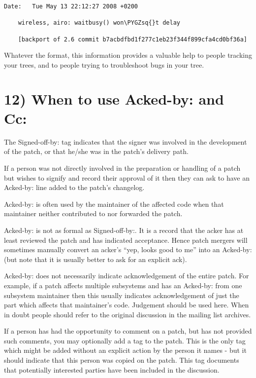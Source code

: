 \documentclass[a4paper,8pt,english]{sphinxmanual}
\def\PYGZsq{\char`\'}
\renewcommand\PYGZsq{\textquotesingle}
\begin{document}
\begin{Verbatim}[commandchars=\\\{\}]
Date:   Tue May 13 22:12:27 2008 +0200

    wireless, airo: waitbusy() won\PYGZsq{}t delay

    [backport of 2.6 commit b7acbdfbd1f277c1eb23f344f899cfa4cd0bf36a]
\end{Verbatim}

Whatever the format, this information provides a valuable help to people
tracking your trees, and to people trying to troubleshoot bugs in your
tree.


\section{12) When to use Acked-by: and Cc:}
\label{process/submitting-patches:when-to-use-acked-by-and-cc}
The Signed-off-by: tag indicates that the signer was involved in the
development of the patch, or that he/she was in the patch's delivery path.

If a person was not directly involved in the preparation or handling of a
patch but wishes to signify and record their approval of it then they can
ask to have an Acked-by: line added to the patch's changelog.

Acked-by: is often used by the maintainer of the affected code when that
maintainer neither contributed to nor forwarded the patch.

Acked-by: is not as formal as Signed-off-by:.  It is a record that the acker
has at least reviewed the patch and has indicated acceptance.  Hence patch
mergers will sometimes manually convert an acker's ``yep, looks good to me''
into an Acked-by: (but note that it is usually better to ask for an
explicit ack).

Acked-by: does not necessarily indicate acknowledgement of the entire patch.
For example, if a patch affects multiple subsystems and has an Acked-by: from
one subsystem maintainer then this usually indicates acknowledgement of just
the part which affects that maintainer's code.  Judgement should be used here.
When in doubt people should refer to the original discussion in the mailing
list archives.

If a person has had the opportunity to comment on a patch, but has not
provided such comments, you may optionally add a  tag to the patch.
This is the only tag which might be added without an explicit action by the
person it names - but it should indicate that this person was copied on the
patch.  This tag documents that potentially interested parties
have been included in the discussion.
\end{document}
